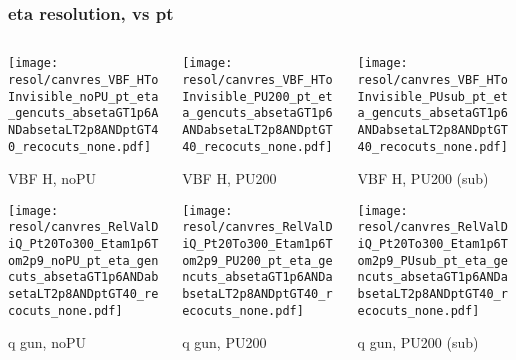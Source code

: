 \documentclass[8pt]{beamer}
\begin{document}
  \begin{frame}
  \frametitle{eta resolution, vs pt}
  
  \begin{columns}
   \begin{column}{0.35\textwidth}
     \texttt{[image: resol/canvres\_VBF\_HToInvisible\_noPU\_pt\_eta\_gencuts\_absetaGT1p6ANDabsetaLT2p8ANDptGT40\_recocuts\_none.pdf]}
     
     VBF H, noPU
    
     \texttt{[image: resol/canvres\_RelValDiQ\_Pt20To300\_Etam1p6Tom2p9\_noPU\_pt\_eta\_gencuts\_absetaGT1p6ANDabsetaLT2p8ANDptGT40\_recocuts\_none.pdf]}
     
     q gun, noPU
   \end{column}
   \begin{column}{0.35\textwidth}
     \texttt{[image: resol/canvres\_VBF\_HToInvisible\_PU200\_pt\_eta\_gencuts\_absetaGT1p6ANDabsetaLT2p8ANDptGT40\_recocuts\_none.pdf]}
     
     VBF H, PU200
    
     \texttt{[image: resol/canvres\_RelValDiQ\_Pt20To300\_Etam1p6Tom2p9\_PU200\_pt\_eta\_gencuts\_absetaGT1p6ANDabsetaLT2p8ANDptGT40\_recocuts\_none.pdf]}
     
     q gun, PU200
   \end{column}
   \begin{column}{0.35\textwidth}
     \texttt{[image: resol/canvres\_VBF\_HToInvisible\_PUsub\_pt\_eta\_gencuts\_absetaGT1p6ANDabsetaLT2p8ANDptGT40\_recocuts\_none.pdf]}
     
     VBF H, PU200 (sub)
    
     \texttt{[image: resol/canvres\_RelValDiQ\_Pt20To300\_Etam1p6Tom2p9\_PUsub\_pt\_eta\_gencuts\_absetaGT1p6ANDabsetaLT2p8ANDptGT40\_recocuts\_none.pdf]}
     
     q gun, PU200 (sub)
   \end{column}
  \end{columns}
 \end{frame}
 
\end{document}
